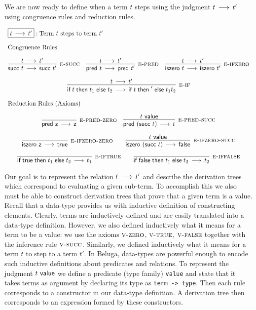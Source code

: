We are now ready to define when a term $t$ steps using the
judgment $t \mathrel{\,\longrightarrow\,} t'$ using congruence rules and reduction rules.

\[
\begin{array}{c}
\multicolumn{1}{l}{\fbox{$t \steps t'$}: \mbox{Term $t$ steps to term $t'$}}
\\[1em]
\multicolumn{1}{l}{\mbox{\text{Congruence Rules}}}\\[1em]
\infer[\SSUC]{\tmsucc t \steps \tmsucc t'}{t \steps t'}
\quad
\infer[\SPRED]{\tmpred t \steps \tmpred t'}{t \steps t'} \quad
\infer[\SISZERO]{\tmiszero t \steps \tmiszero t'}{t \steps t'}
\\[1em]
\infer[\SIF]{\tmif t {t_1}{t_2} \steps \tmif t' {t_1}{t_2}}{t \steps t'}
\\[1em]
\multicolumn{1}{l}{\mbox{\text{Reduction Rules (Axioms)}}}\\[1em]
\infer[\SPREDZ]{\tmpred \tmzero \steps \tmzero}{}\quad
\infer[\SPREDSUCC]{\tmpred (\tmsucc t) \steps t}{t \isv}\\[1em]
\infer[\SISZEROZ]{\tmiszero \tmzero \steps \tmtrue}{} \qquad
\infer[\SISZEROSUCC]{\tmiszero (\tmsucc t) \steps \tmfalse}{t \isv} \\[1em]
\infer[\SIFT]{\tmif \tmtrue {t_1}{t_2} \steps t_1}{}\qquad
\infer[\SIFF]{\tmif \tmfalse {t_1}{t_2} \steps t_2}{}
\end{array}
\]

Our goal is to represent the relation $t \mathrel{\,\longrightarrow\,} t'$ and describe the derivation
trees which correspond to evaluating a given sub-term. To accomplish this we
also must be able to construct derivation trees that prove that a given term is
a value. Recall that a data-type provides us with inductive definition of
constructing elements. Clearly, terms are inductively defined and are easily
translated into a data-type definition. However, we also defined inductively
what it means for a term to be a value: we use the axioms $\textsc{v-zero}$, $\textsc{v-true}$,
$\textsc{v-false}$ together with the inference rule $\textsc{v-succ}$. Similarly, we defined
inductively what it means for a term $t$ to step to a term $t'$. In Beluga,
data-types are powerful enough to encode such inductive definitions about
predicates and relations. To represent the judgment $t ~\textsf{value}$ we define a
predicate (type family) \lstinline!value! and state that it takes terms as
argument by declaring its type as \lstinline!term -> type!. Then each rule
corresponds to a constructor in our data-type definition. A derivation tree then
corresponds to an expression formed by these constructors.

